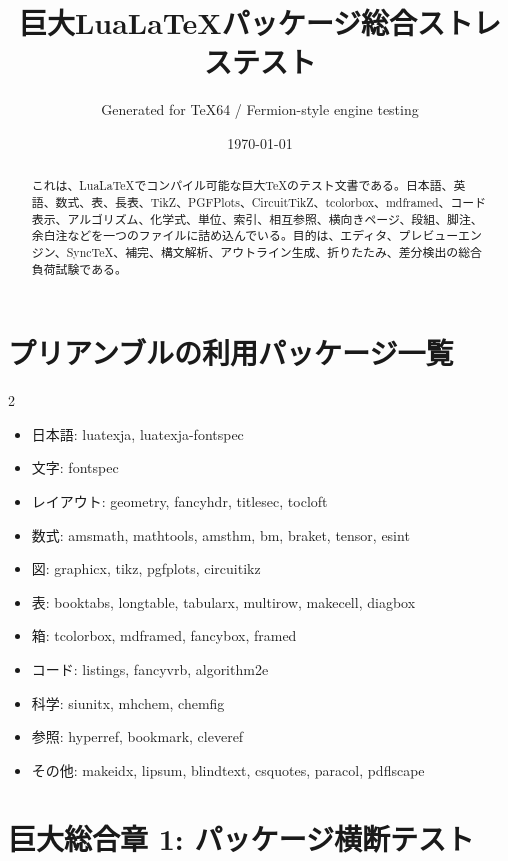\documentclass[12pt,a4paper,openany]{ltjsbook}
\title{巨大LuaLaTeXパッケージ総合ストレステスト}
\author{Generated for TeX64 / Fermion-style engine testing}
\date{\today}
\theoremstyle{definition}
\theoremstyle{plain}
\theoremstyle{remark}
\begin{document}
\frontmatter
\maketitle

\begin{abstract}
これは、LuaLaTeXでコンパイル可能な巨大TeXのテスト文書である。日本語、英語、数式、表、長表、TikZ、PGFPlots、CircuitTikZ、tcolorbox、mdframed、コード表示、アルゴリズム、化学式、単位、索引、相互参照、横向きページ、段組、脚注、余白注などを一つのファイルに詰め込んでいる。目的は、エディタ、プレビューエンジン、SyncTeX、補完、構文解析、アウトライン生成、折りたたみ、差分検出の総合負荷試験である。
\end{abstract}

\tableofcontents
\listoffigures
\listoftables

\chapter{プリアンブルの利用パッケージ一覧}
\begin{multicols}{2}
\begin{itemize}[nosep]
  \item 日本語: luatexja, luatexja-fontspec
  \item 文字: fontspec
  \item レイアウト: geometry, fancyhdr, titlesec, tocloft
  \item 数式: amsmath, mathtools, amsthm, bm, braket, tensor, esint
  \item 図: graphicx, tikz, pgfplots, circuitikz
  \item 表: booktabs, longtable, tabularx, multirow, makecell, diagbox
  \item 箱: tcolorbox, mdframed, fancybox, framed
  \item コード: listings, fancyvrb, algorithm2e
  \item 科学: siunitx, mhchem, chemfig
  \item 参照: hyperref, bookmark, cleveref
  \item その他: makeidx, lipsum, blindtext, csquotes, paracol, pdflscape
\end{itemize}
\end{multicols}

\mainmatter
\chapter{巨大総合章 1: パッケージ横断テスト}\label{chap:1}
\end{document}
